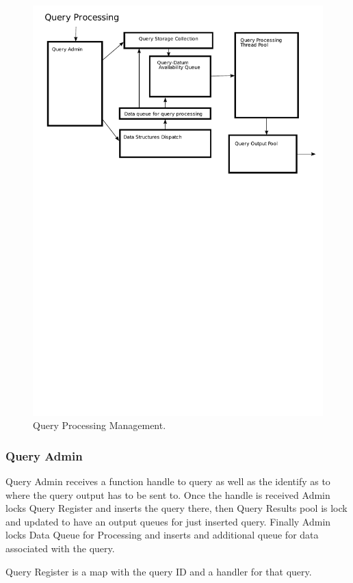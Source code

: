 \documentclass[11pt]{article}
\begin{document}
\begin{figure}
  \includegraphics[width=5.00in]{QueryProcessing.pdf}
  \caption{Query Processing Management.}
  \label{QueryProcessingPic}
\end{figure}

\subsubsection{Query Admin}

Query Admin receives a function handle to query as well as the identify as to where the query output has to be sent to. Once the handle is received Admin locks Query Register and inserts the query there, then Query Results pool is lock and updated to have an output queues for just inserted query. Finally Admin locks Data Queue for Processing and inserts and additional queue for data associated with the query. 

Query Register is a map with the query ID and a handler for that query. 
\end{document}
